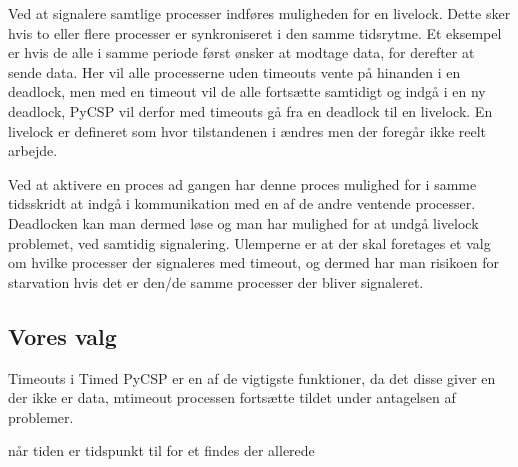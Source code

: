 Ved at signalere samtlige processer indføres muligheden for en livelock. Dette
sker hvis to eller flere processer er  synkroniseret i den samme tidsrytme.
Et eksempel er hvis de alle i samme periode først ønsker at modtage data, for 
derefter at sende data. Her vil alle processerne uden timeouts vente på 
hinanden i en deadlock, men med en timeout vil de alle fortsætte samtidigt og 
indgå i en ny deadlock, PyCSP vil derfor med timeouts gå fra en deadlock til 
en livelock. En livelock er defineret som hvor tilstandenen i ændres men der
foregår ikke reelt arbejde. 

Ved at aktivere en proces ad gangen har denne proces mulighed for i samme 
tidsskridt at indgå i kommunikation med en af de andre ventende processer. 
Deadlocken kan man dermed løse og man har mulighed for at undgå livelock 
problemet, ved samtidig signalering.
Ulemperne er at der skal foretages et valg om hvilke processer der signaleres 
med  timeout, og dermed har man risikoen for starvation hvis det 
er den/de samme processer der bliver signaleret.


\subsection{Vores valg} 

Timeouts i Timed PyCSP er en af de vigtigste funktioner, da det disse giver en
der ikke er data, mtimeout processen fortsætte  tildet under antagelsen af 
problemer.

når tiden er  tidspunkt
til for et findes der allerede  
